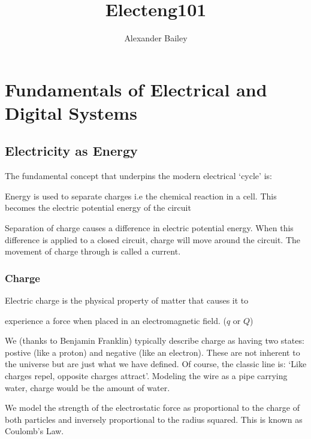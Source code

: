 \documentclass[12pt]{article}
\begin{document}
\setlength{\parskip}{\baselineskip}%
\graphicspath{ {/home/ab/school/notes/electeng101/} }

\title{Electeng101}
\author{Alexander Bailey}
\maketitle
\flushbottom

\section{Fundamentals of Electrical and Digital Systems}
\subsection{Electricity as Energy}
The fundamental concept that underpins the modern electrical `cycle' is: 
\begin{definition*}
  Energy is used to separate charges i.e the chemical reaction in a cell. This becomes the electric potential energy of the circuit
\end{definition*}

Separation of charge causes a difference in electric potential energy.
When this difference is applied to a closed circuit, charge will move around the circuit.
The movement of charge through is called a current. 

\subsubsection{Charge}
\begin{definition*}
  Electric charge is the physical property of matter that causes it to 

  experience a force when placed in an electromagnetic field. ($q$ or $Q$)
\end{definition*}

We (thanks to Benjamin Franklin) typically describe charge as having two states: postive (like a proton) and negative (like an electron).
These are not inherent to the universe but are just what we have defined.
Of course, the classic line is: `Like charges repel, opposite charges attract'.
Modeling the wire as a pipe carrying water, charge would be the amount of water. 

We model the strength of the electrostatic force as proportional to the charge of both particles and inversely proportional to the radius squared.
This is known as Coulomb's Law.
\end{document}
